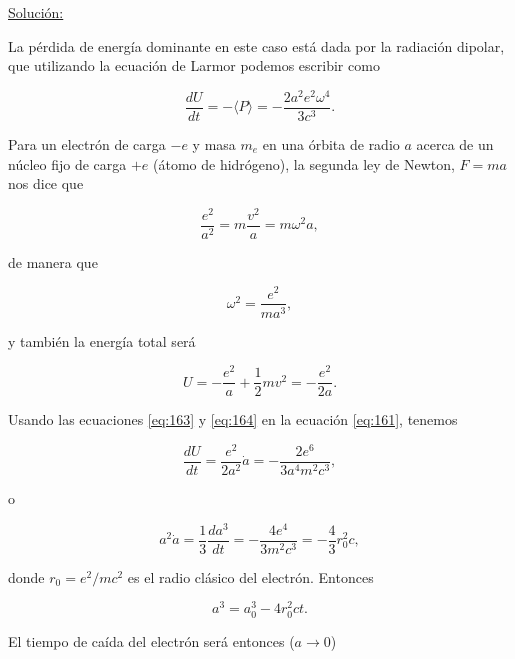 \documentclass[a4paper,11pt]{article}
\numberwithin{equation}{section}
\begin{document}
\vspace{.3cm} \underline{Solución:} \vspace{.3cm}

La pérdida de energía dominante en este caso está dada por la radiación dipolar, 
que utilizando la ecuación de Larmor podemos escribir como 

\begin{equation}
 \frac{dU}{dt} = - \langle P \rangle = - \frac{2a^2e^2\omega^4}{3c^3}.
 \label{eq:161}
\end{equation}

Para un electrón de carga $-e$ y masa $m_e$ en una órbita de radio $a$ acerca 
de un núcleo fijo de carga $+e$ (átomo de hidrógeno), la segunda ley de Newton, 
$F=ma$ nos dice que 

\begin{equation}
 \frac{e^2}{a^2} = m \frac{v^2}{a} = m\omega^2a,
\end{equation}

de manera que 

\begin{equation}
 \omega^2 = \frac{e^2}{ma^3},
 \label{eq:163}
\end{equation}

y también la energía total será 

\begin{equation}
 U = - \frac{e^2}{a} + \frac{1}{2}mv^2 = - \frac{e^2}{2a}.
 \label{eq:164}
\end{equation}

Usando las ecuaciones \eqref{eq:163} y \eqref{eq:164} en la ecuación \eqref{eq:161}, 
tenemos 

\begin{equation}
 \frac{dU}{dt} = \frac{e^2}{2a^2} \dot{a} = - \frac{2e^6}{3a^4m^2c^3},
\end{equation}

o 

\begin{equation}
 a^2\dot{a} = \frac{1}{3} \frac{da^3}{dt} = - \frac{4e^4}{3m^2c^3} = - \frac{4}{3}r_0^2c,
\end{equation}

donde $r_0 = e^2/mc^2$ es el radio clásico del electrón. Entonces 

\begin{equation}
 a^3 = a_0^3 - 4r_0^2ct.
\end{equation}

El tiempo de caída del electrón será entonces ($a \rightarrow 0$) 
\end{document}
